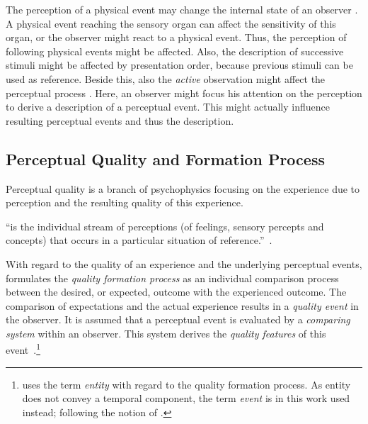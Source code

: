 The perception of a physical event may change the internal state of an observer \citep{raake_quality_2014}.
A physical event reaching the sensory organ can affect the sensitivity of this organ, or the observer might react to a physical event.
Thus, the perception of following physical events might be affected.
Also, the description of successive stimuli might be affected by presentation order, because previous stimuli can be used as reference.
Beside this, also the \emph{active} observation might affect the perceptual process \citep[][p.~30]{raake_quality_2014}.
Here, an observer might focus his attention on the perception to derive a description of a perceptual event.
This might actually influence resulting perceptual events and thus the description.


\subsection{Perceptual Quality and Formation Process}\label{related:perceivedQuality}
Perceptual quality is a branch of psychophysics focusing on the experience due to perception and the resulting quality of this experience.
\begin{definition}[Experiencing]
``is the individual stream of perceptions (of feelings, sensory percepts and concepts) that occurs in a particular situation of reference.''~\citep[p.~13]{raake_quality_2014}.
\end{definition}

With regard to the quality of an experience and the underlying perceptual events, \citet{jekosch_voice_2005} formulates the \emph{quality formation process} as an individual comparison process between the desired, or expected, outcome with the experienced outcome.
The comparison of expectations and the actual experience results in a \emph{quality event} in the observer.
It is assumed that a perceptual event is evaluated by a \emph{comparing system} within an observer.
This system  derives the \emph{quality features} of this event~\citep[\cf,][p.~17]{jekosch_voice_2005}.\footnote{\citet{jekosch_voice_2005} uses the term \emph{entity} with regard to the quality formation process.
As entity does not convey a temporal component, the term \emph{event} is in this work used instead; following the notion of \citet{blauert_spatial_1996}.}

